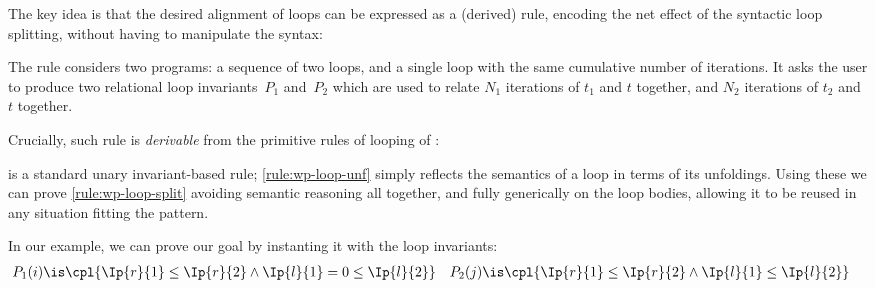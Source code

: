 \documentclass[acmsmall,nonacm,screen,appendix]{acmart}
\begin{document}
The key idea is that the desired alignment of loops can be expressed
as a (derived) rule, encoding the net effect of the syntactic loop splitting,
without having to manipulate the syntax:
\begin{proofrule}
     \label{rule:wp-loop-split}
\end{proofrule}
The rule considers two programs: a sequence of two loops, and a single loop
with the same cumulative number of iterations.
It asks the user to produce two relational loop invariants~$P_1$ and~$P_2$
which are used to relate $N_1$ iterations of $t_1$ and $t$ together,
and $N_2$ iterations of $t_2$ and $t$ together.

Crucially,
such rule is \emph{derivable}
from the primitive rules of looping of \thelogic:
\begin{proofrules}\small
     \label{rule:wp-loop}

     \label{rule:wp-loop-unf}
\end{proofrules}
 is a standard unary invariant-based rule;
\ref{rule:wp-loop-unf} simply reflects the
semantics of a loop in terms of its unfoldings.
Using these
we can prove \ref{rule:wp-loop-split}
avoiding semantic reasoning all together,
and fully generically on the loop bodies,
allowing it to be reused in any situation fitting the pattern.

In our example, we can prove our goal by instanting it with the loop invariants:
\begin{align*}
  P_1(i) &\is
    \cpl{
      \Ip{r}{1}\leq\Ip{r}{2}
      \land
      \Ip{l}{1}=0\leq\Ip{l}{2}
    }
  &
  P_2(j) &\is
    \cpl{
      \Ip{r}{1}\leq\Ip{r}{2}
      \land
      \Ip{l}{1}\leq\Ip{l}{2}
    }
\end{align*}
\end{document}
